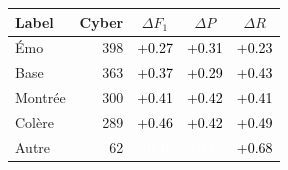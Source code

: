 \begin{tabular}{lrccc}
\toprule
\textbf{Label} & \textbf{Cyber} & \textbf{$\Delta F_1$} & \textbf{$\Delta P$} & \textbf{$\Delta R$} \\
\midrule
Émo & 398 & \cellcolor[HTML]{C7EA97}\textcolor{black}{+0.27} & \cellcolor[HTML]{D0EB8E}\textcolor{black}{+0.31} & \cellcolor[HTML]{C0EAA2}\textcolor{black}{+0.23} \\
Base & 363 & \cellcolor[HTML]{E4EC7F}\textcolor{black}{+0.37} & \cellcolor[HTML]{CBEA92}\textcolor{black}{+0.29} & \cellcolor[HTML]{EEDC6F}\textcolor{black}{+0.43} \\
Montrée & 300 & \cellcolor[HTML]{EEE172}\textcolor{black}{+0.41} & \cellcolor[HTML]{EEDF71}\textcolor{black}{+0.42} & \cellcolor[HTML]{EEE373}\textcolor{black}{+0.41} \\
Colère & 289 & \cellcolor[HTML]{F0CB66}\textcolor{black}{+0.46} & \cellcolor[HTML]{EEDD6F}\textcolor{black}{+0.42} & \cellcolor[HTML]{F1BA5D}\textcolor{black}{+0.49} \\
Autre & 62 & \cellcolor[HTML]{E4602C}\textcolor{white}{+0.76} & \cellcolor[HTML]{E25727}\textcolor{white}{+0.78} & \cellcolor[HTML]{E97B39}\textcolor{black}{+0.68} \\
\bottomrule
\end{tabular}
